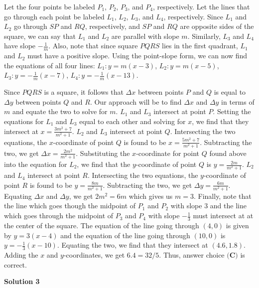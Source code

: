 \begin{enumerate}
 Let the four points be labeled $P_1$, $P_2$, $P_3$, and $P_4$, respectively. Let the lines that go through each point be labeled $L_1$, $L_2$, $L_3$, and $L_4$, respectively. Since $L_1$ and $L_2$ go through $SP$ and $RQ$, respectively, and $SP$ and $RQ$ are opposite sides of the square, we can say that $L_1$ and $L_2$ are parallel with slope $m$. Similarly, $L_3$ and $L_4$ have slope $-\frac{1}{m}$. Also, note that since square $PQRS$ lies in the first quadrant, $L_1$ and $L_2$ must have a positive slope. Using the point-slope form, we can now find the equations of all four lines: $L_1: y = m(x-3)$, $L_2: y = m(x-5)$, $L_3: y = -\frac{1}{m}(x-7)$, $L_4: y = -\frac{1}{m}(x-13)$.

 
Since $PQRS$ is a square, it follows that $\Delta x$ between points $P$ and $Q$ is equal to $\Delta y$ between points $Q$ and $R$. Our approach will be to find $\Delta x$ and $\Delta y$ in terms of $m$ and equate the two to solve for $m$. $L_1$ and $L_3$ intersect at point $P$. Setting the equations for $L_1$ and $L_3$ equal to each other and solving for $x$, we find that they intersect at $x = \frac{3m^2 + 7}{m^2 + 1}$. $L_2$ and $L_3$ intersect at point $Q$. Intersecting the two equations, the $x$-coordinate of point $Q$ is found to be $x = \frac{5m^2 + 7}{m^2 + 1}$. Subtracting the two, we get $\Delta x = \frac{2m^2}{m^2 + 1}$. Substituting the $x$-coordinate for point $Q$ found above into the equation for $L_2$, we find that the $y$-coordinate of point $Q$ is $y = \frac{2m}{m^2+1}$. $L_2$ and $L_4$ intersect at point $R$. Intersecting the two equations, the $y$-coordinate of point $R$ is found to be $y = \frac{8m}{m^2 + 1}$. Subtracting the two, we get $\Delta y = \frac{6m}{m^2 + 1}$. Equating $\Delta x$ and $\Delta y$, we get $2m^2 = 6m$ which gives us $m = 3$. Finally, note that the line which goes though the midpoint of $P_1$ and $P_2$ with slope $3$ and the line which goes through the midpoint of $P_3$ and $P_4$ with slope $-\frac{1}{3}$ must intersect at at the center of the square. The equation of the line going through $(4,0)$ is given by $y = 3(x-4)$ and the equation of the line going through $(10,0)$ is $y = -\frac{1}{3}(x-10)$. Equating the two, we find that they intersect at $(4.6, 1.8)$. Adding the $x$ and $y$-coordinates, we get $6.4 = 32/5$. Thus, answer choice $\boxed{\textbf{(C)}}$ is correct.

 



\textbf{Solution 3}


\end{enumerate}
